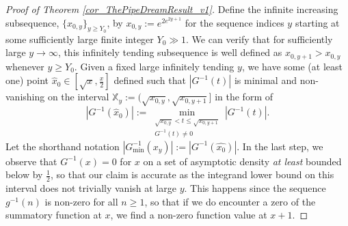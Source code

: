 \documentclass[11pt,reqno,a4letter]{article}
\numberwithin{figure}{section}
\numberwithin{table}{section}
\theoremstyle{plain}
\numberwithin{theorem}{section}
\theoremstyle{definition}
\begin{document}
\begin{proof}[Proof of Theorem \ref{cor_ThePipeDreamResult_v1}] 
\label{proofOf_cor_ThePipeDreamResult_v1} 
Define the infinite increasing subsequence, 
$\{x_{0,y}\}_{y \geq Y_0}$, by $x_{0,y} := e^{2e^{2y+1}}$ for the sequence indices $y$ 
starting at some sufficiently 
large finite integer $Y_0 \gg 1$. 
We can verify that for sufficiently large $y \rightarrow \infty$, this infinitely 
tending subsequence is well defined as $x_{0,y+1} > x_{0,y}$ whenever $y \geq Y_0$. 
Given a fixed large infinitely tending $y$, we have some (at least one) point 
$\widehat{x}_0 \in \left[\sqrt{x}, \frac{x}{2}\right]$ defined such that 
$|G^{-1}(t)|$ is minimal and non-vanishing on the interval 
$\mathbb{X}_y := (\sqrt{x_{0,y}}, \sqrt{x_{0,y+1}}]$ 
in the form of 
\[
\left\lvert G^{-1}(\widehat{x}_0) \right\rvert := 
     \min_{\substack{\sqrt{x_{0,y}} < t \leq \sqrt{x_{0,y+1}} \\ G^{-1}(t) \neq 0}} |G^{-1}(t)|. 
\] 
Let the shorthand notation $|G_{\min}^{-1}(x_y)| := |G^{-1}(\widehat{x_0})|$. 
In the last step, we observe that $G^{-1}(x) = 0$ for $x$ on a set of 
asymptotic density \emph{at least} bounded below by $\frac{1}{2}$, so that our 
claim is accurate as the integrand lower bound on this interval 
does not trivially vanish at large $y$. This happens since the sequence 
$g^{-1}(n)$ is non-zero for all $n \geq 1$, so that if we do encounter a zero of the 
summatory function at $x$, we find a non-zero function value at $x+1$. 


\end{proof}
\end{document}
